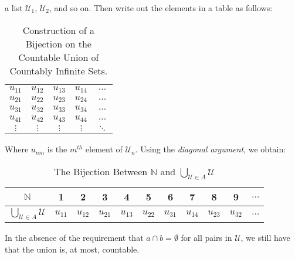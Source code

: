             a list $\mathcal{U}_{1}$, $\mathcal{U}_{2}$, and
            so on. Then write out the elements in a table as
            follows:
            \begin{table}[H]
                \captionsetup{type=table}
                \centering
                \begin{tabular}{ccccc}
                    $u_{11}$&$u_{12}$&$u_{13}$
                    &$u_{14}$&$\hdots$\\
                    $u_{21}$&$u_{22}$&$u_{23}$
                    &$u_{24}$&$\hdots$\\
                    $u_{31}$&$u_{32}$&$u_{33}$
                    &$u_{34}$&$\hdots$\\
                    $u_{41}$&$u_{42}$&$u_{43}$
                    &$u_{44}$&$\hdots$\\
                    $\vdots$&$\vdots$&$\vdots$
                    &$\vdots$&$\ddots$
                \end{tabular}
                \caption{Construction of a Bijection on the
                         Countable Union of Countably Infinite
                         Sets.}
                \label{table:Func_Countable_Union_of_Countable}
            \end{table}
            Where $u_{nm}$ is the $m^{th}$ element of
            $\mathcal{U}_{n}$.
            Using the \textit{diagonal argument},
            we obtain:
            \begin{table}[H]
                \captionsetup{type=table}
                \centering
                \begin{tabular}{|c|c|c|c|c|c|c|c|c|c|c|}
                    \hline
                    $\mathbb{N}$&1&2&3&4&5&6&7&8&9&$\hdots$\\
                    \hline
                    $\bigcup_{\mathcal{U}\in{A}}\mathcal{U}$&
                    $u_{11}$&$u_{12}$&$u_{21}$&$u_{13}$&
                    $u_{22}$&$u_{31}$&$u_{14}$&$u_{23}$&
                    $u_{32}$&$\hdots$\\
                    \hline
                \end{tabular}
                \caption{The Bijection Between $\mathbb{N}$ and
                         $\bigcup_{\mathcal{U}\in{A}}\mathcal{U}$}
                \label{table:Func_Bijection_on_Countable_Union}
            \end{table}
            In the absence of the requirement that
            $a\cap{b}=\emptyset$ for all pairs in $\mathcal{U}$,
            we still have that the union is, at most, countable.
